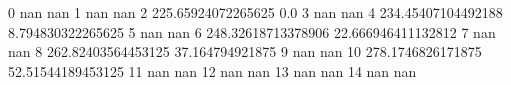 0 nan nan
1 nan nan
2 225.65924072265625 0.0
3 nan nan
4 234.45407104492188 8.794830322265625
5 nan nan
6 248.32618713378906 22.666946411132812
7 nan nan
8 262.82403564453125 37.164794921875
9 nan nan
10 278.1746826171875 52.51544189453125
11 nan nan
12 nan nan
13 nan nan
14 nan nan
